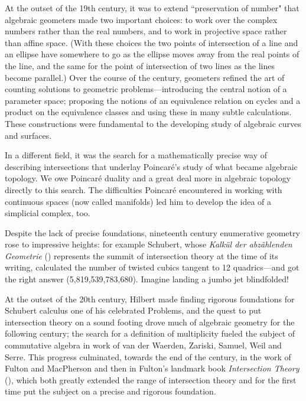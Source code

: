 At the outset of the 19th century, it was to extend ``preservation of number" that algebraic geometers made two important choices: to work over the complex numbers rather than the real numbers, and to work in projective space rather than affine space. (With these choices the two points of intersection of a line and an ellipse have somewhere to go as the ellipse moves away from the real points of the line, and the same for 
the point of intersection of two lines as the lines become parallel.) Over the course of the century, geometers refined the art of counting solutions to geometric problems---introducing the central notion of a parameter space; proposing the notions of an equivalence relation on cycles and a product on the equivalence classes and using these in many subtle calculations. These constructions were fundamental to the developing study of algebraic curves and surfaces. 

In a different field, it was the search for a mathematically precise way of describing intersections that underlay Poincar\'e's study of what became algebraic topology. We owe Poincar\'e duality and a great deal more in algebraic topology directly to this search.
The difficulties Poincar\'e encountered in working with continuous spaces (now called manifolds) led him to develop the idea of a simplicial complex, too. 

Despite the lack of precise foundations, nineteenth century enumerative geometry rose to impressive heights: for example Schubert, 
whose \emph{Kalk\"ul der abz\"ahlenden Geometrie} (\cite{MR555576}) represents the summit of intersection theory at the time of its writing, calculated the number of twisted cubics tangent to 12 quadrics---and got the right answer (5,819,539,783,680). Imagine landing a jumbo jet blindfolded!

At the outset of the 20th century, Hilbert made finding rigorous foundations for Schubert calculus one of his celebrated Problems, and the quest to put intersection theory on a sound footing drove much of algebraic geometry for the following century;  the search for a definition of multiplicity fueled the subject of commutative algebra in work of van der Waerden, Zariski, Samuel, Weil and Serre. This progress culminated, towards the end of the century,  in the work of Fulton and MacPherson and then in Fulton's landmark book \emph{Intersection Theory} (\cite{Fulton1984}), which both greatly extended the range of intersection theory and for the first time put the subject on a precise and rigorous foundation.

